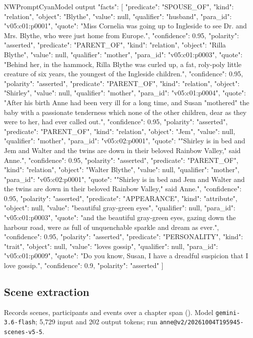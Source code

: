 \begin{nwprompt}{NWPromptCyan}{Model output}
{"facts": [
  {"predicate": "SPOUSE_OF", "kind": "relation", "object": "Blythe", "value": null, "qualifier": "husband", "para_id": "v05:c01:p0001", "quote": "Miss Cornelia was going up to Ingleside to see Dr. and Mrs. Blythe, who were just home from Europe.", "confidence": 0.95, "polarity": "asserted"},
  {"predicate": "PARENT_OF", "kind": "relation", "object": "Rilla Blythe", "value": null, "qualifier": "mother", "para_id": "v05:c01:p0003", "quote": "Behind her, in the hammock, Rilla Blythe was curled up, a fat, roly-poly little creature of six years, the youngest of the Ingleside children.", "confidence": 0.95, "polarity": "asserted"},
  {"predicate": "PARENT_OF", "kind": "relation", "object": "Shirley", "value": null, "qualifier": "mother", "para_id": "v05:c01:p0004", "quote": "After his birth Anne had been very ill for a long time, and Susan "mothered" the baby with a passionate tenderness which none of the other children, dear as they were to her, had ever called out.", "confidence": 0.95, "polarity": "asserted"},
  {"predicate": "PARENT_OF", "kind": "relation", "object": "Jem", "value": null, "qualifier": "mother", "para_id": "v05:c02:p0001", "quote": ""Shirley is in bed and Jem and Walter and the twins are down in their beloved Rainbow Valley," said Anne.", "confidence": 0.95, "polarity": "asserted"},
  {"predicate": "PARENT_OF", "kind": "relation", "object": "Walter Blythe", "value": null, "qualifier": "mother", "para_id": "v05:c02:p0001", "quote": ""Shirley is in bed and Jem and Walter and the twins are down in their beloved Rainbow Valley," said Anne.", "confidence": 0.95, "polarity": "asserted"},
  {"predicate": "APPEARANCE", "kind": "attribute", "object": null, "value": "beautiful gray-green eyes", "qualifier": null, "para_id": "v05:c01:p0003", "quote": "and the beautiful gray-green eyes, gazing down the harbour road, were as full of unquenchable sparkle and dream as ever.", "confidence": 0.95, "polarity": "asserted"},
  {"predicate": "PERSONALITY", "kind": "trait", "object": null, "value": "loves gossip", "qualifier": null, "para_id": "v05:c01:p0009", "quote": "Do you know, Susan, I have a dreadful suspicion that I love gossip.", "confidence": 0.9, "polarity": "asserted"}
]}
\end{nwprompt}

\subsection*{Scene extraction}
Records scenes, participants and events over a chapter span (\sys). Model \texttt{gemini-3.6-flash}; 5,729 input and 202 output tokens; run \nolinkurl{anne@v2/20261004T195945-scenes-v5-5}.

